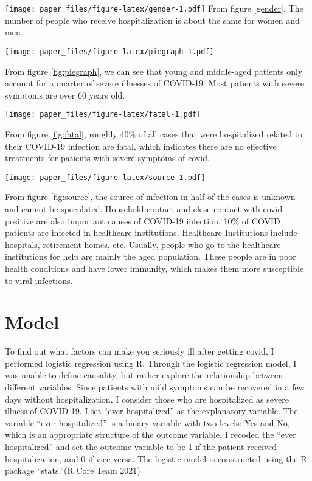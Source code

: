 \documentclass[
]{article}
\begin{document}
\texttt{[image: paper\_files/figure-latex/gender-1.pdf]}
From figure \ref{gender}, The number of people who receive hospitalization is about the same for women and men.

\texttt{[image: paper\_files/figure-latex/piegraph-1.pdf]}

From figure \ref{fig:piegraph}, we can see that young and middle-aged patients only account for a quarter of severe illnesses of COVID-19. Most patients with severe symptoms are over 60 years old.

\texttt{[image: paper\_files/figure-latex/fatal-1.pdf]}

From figure \ref{fig:fatal}, roughly 40\% of all cases that were hospitalized related to their COVID-19 infection are fatal, which indicates there are no effective treatments for patients with severe symptoms of covid.

\texttt{[image: paper\_files/figure-latex/source-1.pdf]}

From figure \ref{fig:source}, the source of infection in half of the cases is unknown and cannot be speculated. Household contact and close contact with covid positive are also important causes of COVID-19 infection. 10\% of COVID patients are infected in healthcare institutions. Healthcare Institutions include hospitals, retirement homes, etc. Usually, people who go to the healthcare institutions for help are mainly the aged population. These people are in poor health conditions and have lower immunity, which makes them more susceptible to viral infections.

\hypertarget{model}{%
\section{Model}\label{model}}

To find out what factors can make you seriously ill after getting covid, I performed logistic regression using R. Through the logistic regression model, I was unable to define causality, but rather explore the relationship between different variables. Since patients with mild symptoms can be recovered in a few days without hospitalization, I consider those who are hospitalized as severe illness of COVID-19. I set ``ever hospitalized'' as the explanatory variable. The variable ``ever hospitalized'' is a binary variable with two levels: Yes and No, which is an appropriate structure of the outcome variable. I recoded the ``ever hospitalized'' and set the outcome variable to be 1 if the patient received hospitalization, and 0 if vice versa. The logistic model is constructed using the R package ``stats.''(R Core Team 2021)
\end{document}
